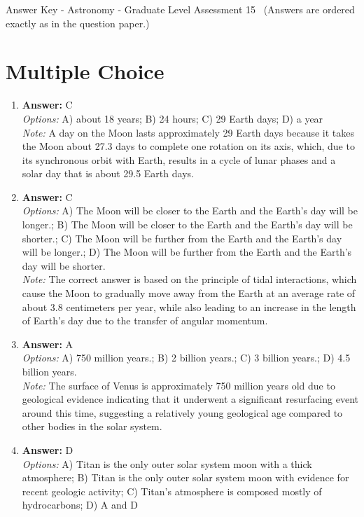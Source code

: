 \documentclass[12pt]{article}
\begin{document}
\begin{center}
Answer Key - Astronomy - Graduate Level Assessment 15 \
\small (Answers are ordered exactly as in the question paper.)
\end{center}

\section*{Multiple Choice}
\begin{enumerate}[label=\arabic*.]
\item \textbf{Answer:} C
\\ \textit{Options:} A) about 18 years; B) 24 hours; C) 29 Earth days; D) a year
\\ \textit{Note:} A day on the Moon lasts approximately 29 Earth days because it takes the Moon about 27.3 days to complete one rotation on its axis, which, due to its synchronous orbit with Earth, results in a cycle of lunar phases and a solar day that is about 29.5 Earth days.
\item \textbf{Answer:} C
\\ \textit{Options:} A) The Moon will be closer to the Earth and the Earth's day will be longer.; B) The Moon will be closer to the Earth and the Earth's day will be shorter.; C) The Moon will be further from the Earth and the Earth's day will be longer.; D) The Moon will be further from the Earth and the Earth's day will be shorter.
\\ \textit{Note:} The correct answer is based on the principle of tidal interactions, which cause the Moon to gradually move away from the Earth at an average rate of about 3.8 centimeters per year, while also leading to an increase in the length of Earth's day due to the transfer of angular momentum.
\item \textbf{Answer:} A
\\ \textit{Options:} A) 750 million years.; B) 2 billion years.; C) 3 billion years.; D) 4.5 billion years.
\\ \textit{Note:} The surface of Venus is approximately 750 million years old due to geological evidence indicating that it underwent a significant resurfacing event around this time, suggesting a relatively young geological age compared to other bodies in the solar system.
\item \textbf{Answer:} D
\\ \textit{Options:} A) Titan is the only outer solar system moon with a thick atmosphere; B) Titan is the only outer solar system moon with evidence for recent geologic activity; C) Titan's atmosphere is composed mostly of hydrocarbons; D) A and D

\end{enumerate}
\end{document}
